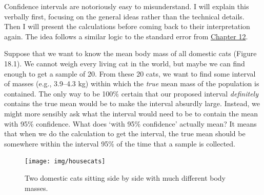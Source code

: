 \documentclass[
  openany]{krantz}
\begin{document}
Confidence intervals are notoriously easy to misunderstand.
I will explain this verbally first, focusing on the general ideas rather than the technical details.
Then I will present the calculations before coming back to their interpretation again.
The idea follows a similar logic to the standard error from \protect\hyperlink{Chapter_12}{Chapter 12}.

Suppose that we want to know the mean body mass of all domestic cats (Figure 18.1).
We cannot weigh every living cat in the world, but maybe we can find enough to get a sample of 20.
From these 20 cats, we want to find some interval of masses (e.g., 3.9--4.3 kg) within which the \emph{true} mean mass of the population is contained.
The only way to be 100\% certain that our proposed interval \emph{definitely} contains the true mean would be to make the interval absurdly large.
Instead, we might more sensibly ask what the interval would need to be to contain the mean with 95\% confidence.
What does `with 95\% confidence' actually mean?
It means that when we do the calculation to get the interval, the true mean should be somewhere within the interval 95\% of the time that a sample is collected.

\begin{figure}
\texttt{[image: img/housecats]} \caption{Two domestic cats sitting side by side with much different body masses.}\label{fig:unnamed-chunk-76}
\end{figure}
\end{document}

